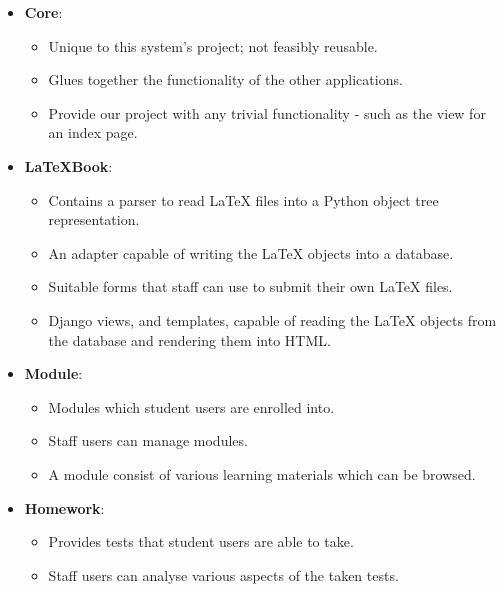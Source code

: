 		\begin{itemize}
			\item \textbf{Core}:
				\begin{itemize}
					\item Unique to this system's project; not feasibly reusable.
					\item Glues together the functionality of the other applications.
					\item Provide our project with any trivial functionality - such as the view for an index page.
				\end{itemize}

			\item \textbf{LaTeXBook}:
				\begin{itemize}
					\item Contains a parser to read LaTeX files into a Python object tree representation.
					\item An adapter capable of writing the LaTeX objects into a database.
					\item Suitable forms that staff can use to submit their own LaTeX files.
					\item Django views, and templates, capable of reading the LaTeX objects from the database and rendering them into HTML.
				\end{itemize}
				
			\item \textbf{Module}:
				\begin{itemize}
					\item Modules which student users are enrolled into.
					\item Staff users can manage modules.
					\item A module consist of various learning materials which can be browsed.
				\end{itemize} 

			\item \textbf{Homework}:
				\begin{itemize}
					\item Provides tests that student users are able to take.
					\item Staff users can analyse various aspects of the taken tests.
				\end{itemize} 
		\end{itemize}